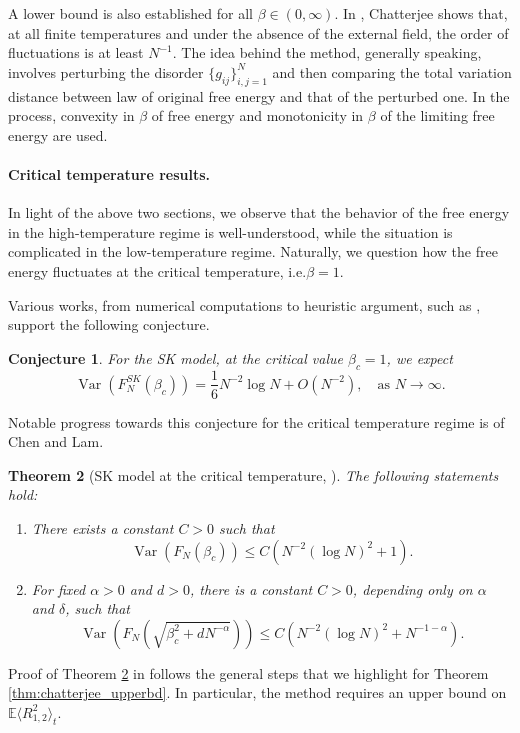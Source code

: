 \documentclass[11pt]{article}
\numberwithin{equation}{section}
\DeclareMathOperator{\Var}{Var}
\newcommand{\beq}{ \begin{equation} }
\newcommand{\eeq}{ \end{equation} }
\newcommand{\ip}[1]{\langle {#1} \rangle }
\def \a {\alpha}
\def \b {\beta}
\def \d {\delta}
\newcommand{\bE}{\mathbb{E}}
\newtheorem{theorem}{Theorem}[section]
\newtheorem{conjecture}[theorem]{Conjecture}
\theoremstyle{remark}
\begin{document}
A lower bound is also established for all $\b \in (0,\infty)$. In \cite{Chatterjee19}, Chatterjee shows that, at all finite temperatures and under the absence of the external field, the order of fluctuations is at least $N^{-1}$. The idea behind the method, generally speaking, involves perturbing the disorder $\{g_{ij}\}_{i,j=1}^N$ and then comparing the total variation distance between law of original free energy and that of the perturbed one. In the process, convexity in $\b$ of free energy and monotonicity in $\b$ of the limiting free energy are used.

\paragraph{Critical temperature results.}
In light of the above two sections, we observe that the behavior of the free energy in the high-temperature regime is well-understood, while the situation is complicated in the low-temperature regime. Naturally, we question how the free energy fluctuates at the critical temperature, i.e.\@ $\b=1$. 


Various works, from numerical computations to heuristic argument, such as \cites{Parisietal_1993, conjSK2}, support the following conjecture.
\begin{conjecture}
For the SK model, at the critical value $\b_c=1$, we expect
\[
\Var(F_N^{SK}(\b_c))= \frac16 N^{-2}\log N + O(N^{-2}), \quad \text{as } N \to \infty.
\]
\end{conjecture}
Notable progress towards this conjecture for the critical temperature regime is \cite{ChenLam19} of Chen and Lam. 

\begin{theorem}[SK model at the critical temperature, \cite{ChenLam19}]\label{thm:chenlam19}
The following statements hold:
    \begin{enumerate}
    \item There exists a constant $C>0$ such that 
    \beq\label{item:chenlam19_crit}
    	\Var\left(F_N(\b_c)\right) \leq C \left( N^{-2}(\log N)^2 +1\right).
    \eeq
    \item For fixed $\a>0$ and $d>0$, there is a constant $C>0$, depending only on $\a$ and $\d$, such that
    \beq
    	\Var\left(F_N(\sqrt{\b_c^2+dN^{-\a}})\right) \leq C \left( N^{-2}(\log N)^2 + N^{-1-\a}\right).
    \eeq
    \end{enumerate}
\end{theorem}

Proof of Theorem \ref{thm:chenlam19} in \cite{ChenLam19} follows the general steps that we highlight for Theorem \ref{thm:chatterjee_upperbd}. In particular, the method requires an upper bound on $\bE \ip{R_{1,2}^2}_t$.
\end{document}
